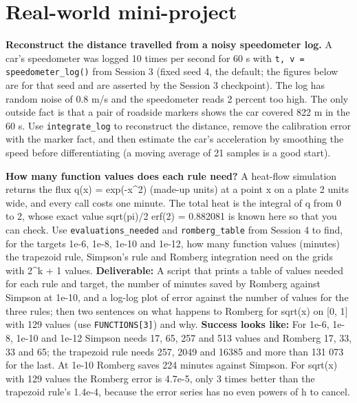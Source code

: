 \documentclass[11pt,a4paper]{article}
\begin{document}
\section{Real-world mini-project}
\textbf{Reconstruct the distance travelled from a noisy speedometer log.} A car's speedometer was logged 10 times per second for 60 s with \texttt{t, v = speedometer\_log()} from Session 3 (fixed seed 4, the default; the figures below are for that seed and are asserted by the Session 3 checkpoint). The log has random noise of 0.8 m/s and the speedometer reads 2 percent too high. The only outside fact is that a pair of roadside markers shows the car covered 822 m in the 60 s. Use \texttt{integrate\_log} to reconstruct the distance, remove the calibration error with the marker fact, and then estimate the car's acceleration by smoothing the speed before differentiating (a moving average of 21 samples is a good start).

\textbf{How many function values does each rule need?} A heat-flow simulation returns the flux q(x) = exp(-x\textasciicircum{}2) (made-up units) at a point x on a plate 2 units wide, and every call costs one minute. The total heat is the integral of q from 0 to 2, whose exact value sqrt(pi)/2 erf(2) = 0.882081 is known here so that you can check. Use \texttt{evaluations\_needed} and \texttt{romberg\_table} from Session 4 to find, for the targets 1e-6, 1e-8, 1e-10 and 1e-12, how many function values (minutes) the trapezoid rule, Simpson's rule and Romberg integration need on the grids with 2\textasciicircum{}k + 1 values. \textbf{Deliverable:} A script that prints a table of values needed for each rule and target, the number of minutes saved by Romberg against Simpson at 1e-10, and a log-log plot of error against the number of values for the three rules; then two sentences on what happens to Romberg for sqrt(x) on [0, 1] with 129 values (use \texttt{FUNCTIONS[3]}) and why. \textbf{Success looks like:} For 1e-6, 1e-8, 1e-10 and 1e-12 Simpson needs 17, 65, 257 and 513 values and Romberg 17, 33, 33 and 65; the trapezoid rule needs 257, 2049 and 16385 and more than 131 073 for the last. At 1e-10 Romberg saves 224 minutes against Simpson. For sqrt(x) with 129 values the Romberg error is 4.7e-5, only 3 times better than the trapezoid rule's 1.4e-4, because the error series has no even powers of h to cancel.
\end{document}
